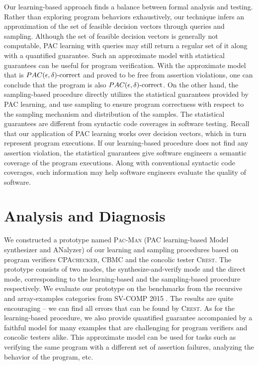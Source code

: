 Our learning-based approach finds a balance between formal analysis and testing. Rather than exploring program behaviors exhaustively, our technique infers an approximation of the set of feasible decision vectors through queries and sampling. Although the set of feasible decision vectors is generally not computable, PAC learning with queries may still return a regular set of it along with a quantified guarantee. Such an approximate model with statistical guarantees can be useful for program verification. With the approximate model that is $PAC(\epsilon, \delta)\text{-correct}$ and proved to be free from assertion violations, one can conclude that the program is also $PAC(\epsilon, \delta)\text{-correct}$. On the other hand, the sampling-based procedure directly utilizes the statistical guarantees provided by PAC learning, and use sampling to ensure program correctness with respect to the sampling mechanism and distribution of the samples. The statistical guarantees are different from syntactic code coverages in software testing. Recall that our application of PAC learning works over decision vectors, which in turn represent program executions. If our learning-based procedure does not find any assertion violation, the statistical guarantees give software engineers a semantic coverage of the program executions. Along with conventional syntactic code coverages, such information may help software engineers evaluate the quality of software.

\section{Analysis and Diagnosis}\label{sec:analysis_diagnosis}

We constructed a prototype named \textsc{Pac-Man} (PAC learning-based Model synthesizer and ANalyzer) of our learning and sampling procedures based on program verifiers \textsc{CPAchecker, CBMC} and the concolic tester \textsc{Crest}. The prototype consists of two modes, the synthesize-and-verify mode and the direct mode, corresponding to the learning-based and the sampling-based procedure respectively. We evaluate our prototype on the benchmarks from the recursive and  array-examples categories from SV-COMP 2015 \cite{svcomp2015}. The results are quite encouraging -- we can find all errors that can be found by \textsc{Crest}. As for the learning-based procedure, we also provide quantified guarantee accompanied by a faithful model for many examples that are challenging for program verifiers and concolic testers alike. This approximate model can be used for tasks such as verifying the same program with a different set of assertion failures, analyzing the behavior of the program, etc. 

